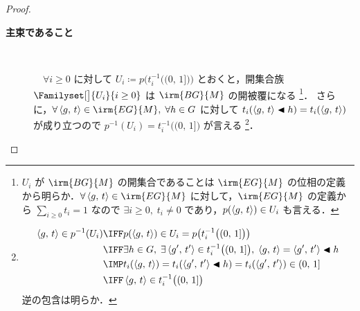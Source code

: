 \documentclass[TQFT_main]{subfiles}
\begin{document}
\begin{proof}
    \begin{description}
        \item[\textbf{主束であること}]　
        
        　$\forall i \ge 0$ に対して $U_i \coloneqq p \bigl( t_i^{-1} \bigl((0,\, 1] \bigr)  \bigr)$ とおくと，開集合族 $\Familyset[\big]{U_i}{i \ge 0}$ は $\irm{BG}{M}$ の開被覆になる
        \footnote{$U_i$ が $\irm{BG}{M}$ の開集合であることは $\irm{EG}{M}$ の位相の定義から明らか．$\forall \expval{g,\, t} \in \irm{EG}{M}$ に対して，$\irm{EG}{M}$ の定義から $\sum_{i \ge 0} t_i = 1$ なので $\exists i \ge 0,\; t_i \neq 0$ であり，$p (\expval{g,\, t}) \in U_i$ も言える．}．
        さらに，$\forall \expval{g,\, t} \in \irm{EG}{M},\; \forall h \in G$ に対して $t_i (\expval{g,\, t} \blacktriangleleft h) = t_i (\expval{g,\, t})$ が成り立つので $p^{-1}(U_i) = t_i^{-1}\bigl( (0,\, 1] \bigr)$ が言える
        \footnote{
        \begin{align}
            \expval{g,\, t} \in p^{-1}(U_i)
            &\IFF p(\expval{g,\, t}) \in U_i = p\bigl(t_i^{-1} \bigl( (0,\, 1] \bigr)\bigr) \\
            &\IFF \exists h \in G,\; \exists \expval{g',\, t'} \in t_i^{-1} \bigl( (0,\, 1]\bigr),\; \expval{g,\, t} = \expval{g',\, t'} \btl h \\
            &\IMP t_i (\expval{g,\, t}) = t_i (\expval{g',\, t'} \btl h) = t_i (\expval{g',\, t'}) \in (0,\, 1] \\
            &\IFF \expval{g,\, t} \in t_i^{-1}\bigl( (0,\, 1] \bigr) 
        \end{align}
        逆の包含は明らか．
        }．


\end{description}
\end{proof}
\end{document}
